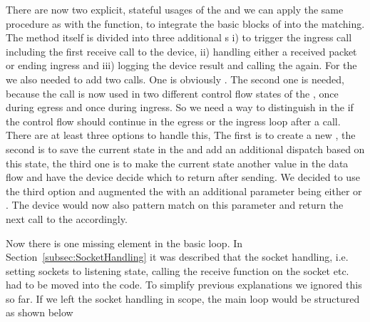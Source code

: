 There are now two explicit, stateful usages of the \dev{} and we can apply the same procedure as with the  function, to integrate the basic blocks of  into the  matching. The method itself is divided into three additional s i)  to trigger the ingress call including the first receive call to the device, ii)  handling either a received packet or ending ingress and iii)  logging the device result and calling the  again. For the \dev{} we also needed to add two calls. One is obviously . The second one is needed, because the call   is now used in two different control flow states of the \stack{}, once during egress and once during ingress. So we need a way to distinguish in the \stack{} if the control flow should continue in the egress or the ingress loop after a  call. There are at least three options to handle this, The first is to create a new , the second is to save the current state in the \stack and add an additional dispatch based on this state, the third one is to make the current state another value in the data flow and have the device decide which  to return after sending. We decided to use the third option and augmented the  with an additional parameter  being either  or . The device would now also pattern match on this parameter and return the next call to the \stack{} accordingly.

Now there is one missing element in the basic loop. In Section~\ref{subsec:SocketHandling} it was described that the socket handling, i.e. setting sockets to listening state, calling the receive function on the socket etc. had to be moved into the \stack{} code. To simplify previous explanations we ignored this so far. If we left the socket handling in scope, the main loop would be structured as shown below

